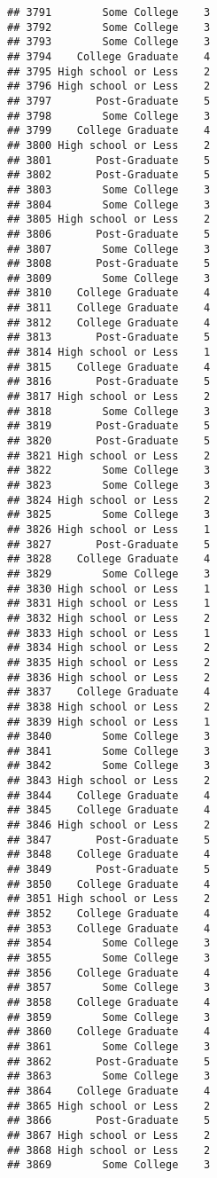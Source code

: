 \documentclass[
]{article}
\begin{document}
\begin{verbatim}
## 3791        Some College    3
## 3792        Some College    3
## 3793        Some College    3
## 3794    College Graduate    4
## 3795 High school or Less    2
## 3796 High school or Less    2
## 3797       Post-Graduate    5
## 3798        Some College    3
## 3799    College Graduate    4
## 3800 High school or Less    2
## 3801       Post-Graduate    5
## 3802       Post-Graduate    5
## 3803        Some College    3
## 3804        Some College    3
## 3805 High school or Less    2
## 3806       Post-Graduate    5
## 3807        Some College    3
## 3808       Post-Graduate    5
## 3809        Some College    3
## 3810    College Graduate    4
## 3811    College Graduate    4
## 3812    College Graduate    4
## 3813       Post-Graduate    5
## 3814 High school or Less    1
## 3815    College Graduate    4
## 3816       Post-Graduate    5
## 3817 High school or Less    2
## 3818        Some College    3
## 3819       Post-Graduate    5
## 3820       Post-Graduate    5
## 3821 High school or Less    2
## 3822        Some College    3
## 3823        Some College    3
## 3824 High school or Less    2
## 3825        Some College    3
## 3826 High school or Less    1
## 3827       Post-Graduate    5
## 3828    College Graduate    4
## 3829        Some College    3
## 3830 High school or Less    1
## 3831 High school or Less    1
## 3832 High school or Less    2
## 3833 High school or Less    1
## 3834 High school or Less    2
## 3835 High school or Less    2
## 3836 High school or Less    2
## 3837    College Graduate    4
## 3838 High school or Less    2
## 3839 High school or Less    1
## 3840        Some College    3
## 3841        Some College    3
## 3842        Some College    3
## 3843 High school or Less    2
## 3844    College Graduate    4
## 3845    College Graduate    4
## 3846 High school or Less    2
## 3847       Post-Graduate    5
## 3848    College Graduate    4
## 3849       Post-Graduate    5
## 3850    College Graduate    4
## 3851 High school or Less    2
## 3852    College Graduate    4
## 3853    College Graduate    4
## 3854        Some College    3
## 3855        Some College    3
## 3856    College Graduate    4
## 3857        Some College    3
## 3858    College Graduate    4
## 3859        Some College    3
## 3860    College Graduate    4
## 3861        Some College    3
## 3862       Post-Graduate    5
## 3863        Some College    3
## 3864    College Graduate    4
## 3865 High school or Less    2
## 3866       Post-Graduate    5
## 3867 High school or Less    2
## 3868 High school or Less    2
## 3869        Some College    3

\end{verbatim}
\end{document}

